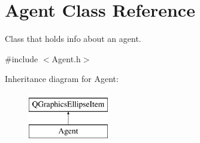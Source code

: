 \hypertarget{class_agent}{\section{Agent Class Reference}
\label{class_agent}
}


Class that holds info about an agent.  




{\ttfamily \#include $<$Agent.\-h$>$}

Inheritance diagram for Agent\-:\begin{figure}[H]
\begin{center}
\leavevmode
\includegraphics[height=2.000000cm]{class_agent}
\end{center}
\end{figure}
